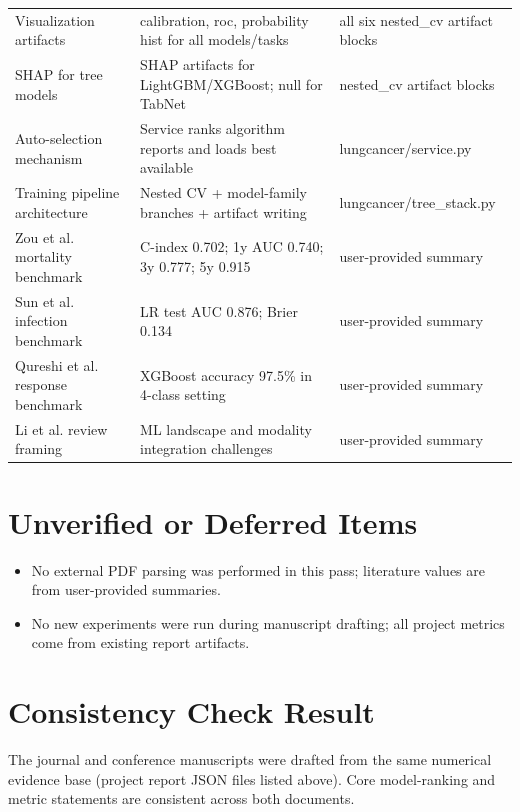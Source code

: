 \documentclass[journal]{IEEEtran}
\begin{document}
\begin{longtable}{p{}p{}p{}}
Visualization artifacts & calibration, roc, probability hist for all models/tasks & all six nested\_cv artifact blocks \\
SHAP for tree models & SHAP artifacts for LightGBM/XGBoost; null for TabNet & nested\_cv artifact blocks \\

Auto-selection mechanism & Service ranks algorithm reports and loads best available & lungcancer/service.py \\
Training pipeline architecture & Nested CV + model-family branches + artifact writing & lungcancer/tree\_stack.py \\

Zou et al. mortality benchmark & C-index 0.702; 1y AUC 0.740; 3y 0.777; 5y 0.915 & user-provided summary \\
Sun et al. infection benchmark & LR test AUC 0.876; Brier 0.134 & user-provided summary \\
Qureshi et al. response benchmark & XGBoost accuracy 97.5\% in 4-class setting & user-provided summary \\
Li et al. review framing & ML landscape and modality integration challenges & user-provided summary \\

\bottomrule
\end{longtable}

\section{Unverified or Deferred Items}
\begin{itemize}
    \item No external PDF parsing was performed in this pass; literature values are from user-provided summaries.
    \item No new experiments were run during manuscript drafting; all project metrics come from existing report artifacts.
\end{itemize}

\section{Consistency Check Result}
The journal and conference manuscripts were drafted from the same numerical evidence base (project report JSON files listed above). Core model-ranking and metric statements are consistent across both documents.
\end{document}
